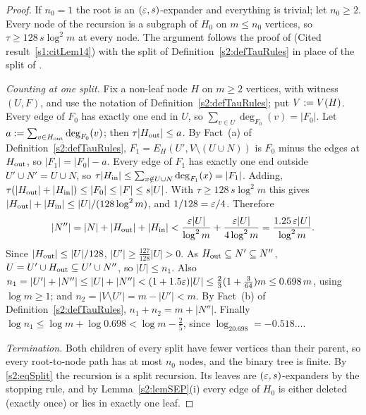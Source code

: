 \begin{proof}
If $n_0=1$ the root is an $(\varepsilon,s)$-expander and everything is trivial; let
$n_0\ge2$. Every node of the recursion is a subgraph of $H_0$ on $m\le n_0$
vertices, so $\tau\ge128\,s\log^2m$ at every node. The argument follows the
proof of \cite[Lemma~14]{BM} (Cited result~\ref{s1:citLem14}) with the split
of Definition~\ref{s2:defTauRules} in place of the split of \cite{BM}.

\emph{Counting at one split.} Fix a non-leaf node $H$ on $m\ge2$ vertices,
with witness $(U,F)$, and use the notation of
Definition~\ref{s2:defTauRules}; put $V\mathrel{:=} V(H)$. Every edge of $F_0$ has
exactly one end in $U$, so $\sum_{v\in U}\deg_{F_0}(v)=|F_0|$. Let
$a\mathrel{:=}\sum_{v\in H_{\mathrm{out}}}\deg_{F_0}(v)$; then $\tau|H_{\mathrm{out}}|\le a$. By Fact~(a) of
Definition~\ref{s2:defTauRules},
$F_1=E_H(U',V\setminus(U\cup N))$ is $F_0$ minus the edges at $H_{\mathrm{out}}$, so
$|F_1|=|F_0|-a$. Every edge of $F_1$ has exactly one end outside $U'\cup
N'=U\cup N$, so $\tau|H_{\mathrm{in}}|\le\sum_{x\notin U\cup N}\deg_{F_1}(x)=|F_1|$.
Adding, $\tau(|H_{\mathrm{out}}|+|H_{\mathrm{in}}|)\le|F_0|\le|F|\le s|U|$. With
$\tau\ge128\,s\log^2m$ this gives $|H_{\mathrm{out}}|+|H_{\mathrm{in}}|\le|U|/(128\log^2m)$, and
$1/128=\varepsilon/4$. Therefore
\[
|N''|=|N|+|H_{\mathrm{out}}|+|H_{\mathrm{in}}|<\frac{\varepsilon|U|}{\log^2m}+\frac{\varepsilon|U|}{4\log^2m}
=\frac{1.25\,\varepsilon|U|}{\log^2m}.
\]
Since $|H_{\mathrm{out}}|\le|U|/128$, $|U'|\ge\frac{127}{128}|U|>0$. As
$H_{\mathrm{out}}\subseteq N'\subseteq N''$, $U=U'\cup H_{\mathrm{out}}\subseteq U'\cup N''$, so
$|U|\le n_1$. Also $n_1=|U'|+|N''|\le|U|+|N''|<(1+1.5\varepsilon)|U|\le
\frac23(1+\frac{3}{64})m\le0.698\,m$, using $\log m\ge1$; and $n_2=|V\setminus
U'|=m-|U'|<m$. By Fact~(b) of Definition~\ref{s2:defTauRules},
$n_1+n_2=m+|N''|$. Finally $\log n_1\le\log m+\log0.698<\log m-\frac25$, since
$\log_20.698=-0.518\ldots$.

\emph{Termination.} Both children of every split have fewer vertices than
their parent, so every root-to-node path has at most $n_0$ nodes, and the
binary tree is finite. By \eqref{s2:eqSplit} the recursion is a split
recursion. Its leaves are $(\varepsilon,s)$-expanders by the stopping rule, and by
Lemma~\ref{s2:lemSEP}(i) every edge of $H_0$ is either deleted (exactly once)
or lies in exactly one leaf.


\end{proof}
